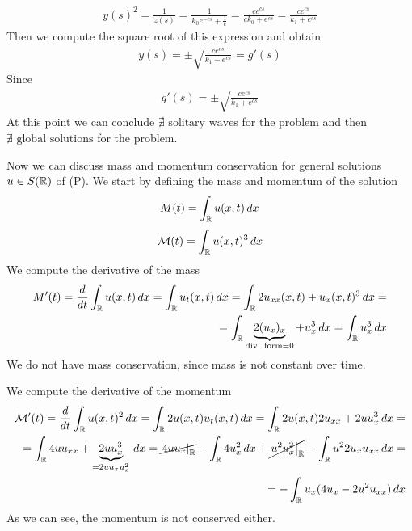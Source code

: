 \[
    \begin{split}
        y(s)^2 = \frac{1}{z(s)} = \frac{1}{k_0 e^{-cs} + \frac{1}{c}} = \frac{c e^{cs}}{c k_0 + e^{cs}} = \frac{c e^{cs}}{k_1 + e^{cs}}
    \end{split}
\]
Then we compute the square root of this expression and obtain
\[
    \begin{split}
        y(s) = \pm \sqrt{\frac{c e^{cs}}{k_1 + e^{cs}}} = g'(s)
    \end{split}
\]
Since 
\[
    \begin{split}
        g'(s) = \pm \sqrt{\frac{c e^{cs}}{k_1 + e^{cs}}} 
    \end{split}
\]
At this point we can conclude \(\nexists \text{ solitary waves}\) for the problem and then \(\nexists \text{ global solutions}\) for the problem.

Now we can discuss mass and momentum conservation for general solutions \(u \in S(\mathbb{R})\) of (P). We start by defining the mass and momentum of the solution
\[
    M(t) = \int_{\mathbb{R}} u(x,t) \, dx
\]
\[
    \mathcal{M}(t) = \int_{\mathbb{R}} u(x,t)^3 \, dx
\]
We compute the derivative of the mass
\[
    \begin{split}
        M'(t) = \frac{d}{dt} \int_{\mathbb{R}} u(x,t) \, dx = \int_{\mathbb{R}} u_t(x,t) \, dx = \int_{\mathbb{R}} 2u_{xx}(x,t) + u_x(x,t)^3 \, dx =\\ 
        = \int_{\mathbb{R}} \underbrace{2(u_x)_x}_{\text{div. form} = 0} + u_x^3 \, dx = \int_{\mathbb{R}} u_x^3 \, dx
    \end{split}
\]
We do not have mass conservation, since mass is not constant over time. 

We compute the derivative of the momentum
\[
    \begin{split}
        \mathcal{M}'(t) = \frac{d}{dt} \int_{\mathbb{R}} u(x,t)^2 \, dx = \int_{\mathbb{R}} 2 u(x,t) u_t(x,t) \, dx = \int_{\mathbb{R}} 2 u(x,t) 2u_{xx} + 2u u_x^3 \, dx= \\
         = \int_{\mathbb{R}} 4 u u_{xx} + \underbrace{2u u_x^3}_{= 2 u u_x u_x^2} \, dx =  \cancel{\left. 4 u u_x \right|_{\mathbb{R}}} - \int_{\mathbb{R}} 4 u_x^2 \, dx + \cancel{\left. u^2 u_x^2 \right|_{\mathbb{R}}} - \int_{\mathbb{R}} u^2 2 u_x u_{xx} \, dx =\\
         = - \int_{\mathbb{R}} u_x (4 u_x - 2 u^2 u_{xx}) \, dx
    \end{split}
\]
As we can see, the momentum is not conserved either.

